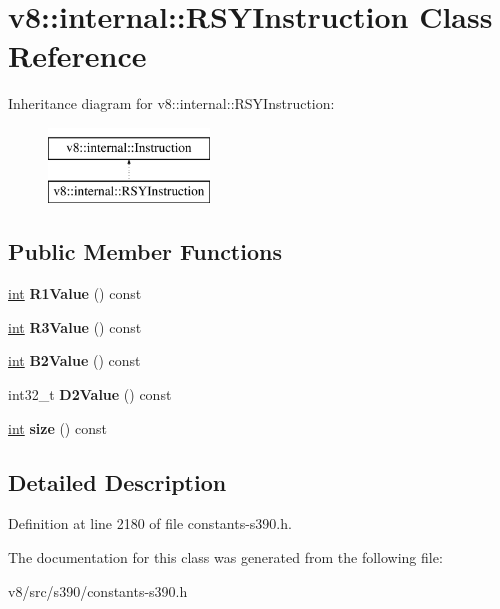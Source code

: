 \hypertarget{classv8_1_1internal_1_1RSYInstruction}{}\section{v8\+:\+:internal\+:\+:R\+S\+Y\+Instruction Class Reference}
\label{classv8_1_1internal_1_1RSYInstruction}
Inheritance diagram for v8\+:\+:internal\+:\+:R\+S\+Y\+Instruction\+:\begin{figure}[H]
\begin{center}
\leavevmode
\includegraphics[height=2.000000cm]{classv8_1_1internal_1_1RSYInstruction}
\end{center}
\end{figure}
\subsection*{Public Member Functions}
\begin{DoxyCompactItemize}
\item 
\mbox{\label{classv8_1_1internal_1_1RSYInstruction_ac874a31cc72d480eb094b2ffa28fc9d5}} 
\mbox{\hyperlink{classint}{int}} {\bfseries R1\+Value} () const
\item 
\mbox{\label{classv8_1_1internal_1_1RSYInstruction_aa75c5a7bf95acefe19216db32099bbed}} 
\mbox{\hyperlink{classint}{int}} {\bfseries R3\+Value} () const
\item 
\mbox{\label{classv8_1_1internal_1_1RSYInstruction_ac5e0ff5c904e16a6681a5210d3e8075d}} 
\mbox{\hyperlink{classint}{int}} {\bfseries B2\+Value} () const
\item 
\mbox{\label{classv8_1_1internal_1_1RSYInstruction_a78b5c60f2762c0627966970646ef7e1b}} 
int32\+\_\+t {\bfseries D2\+Value} () const
\item 
\mbox{\label{classv8_1_1internal_1_1RSYInstruction_a51e536f80bbed3177ff7720b82d8f30f}} 
\mbox{\hyperlink{classint}{int}} {\bfseries size} () const
\end{DoxyCompactItemize}


\subsection{Detailed Description}


Definition at line 2180 of file constants-\/s390.\+h.



The documentation for this class was generated from the following file\+:\begin{DoxyCompactItemize}
\item 
v8/src/s390/constants-\/s390.\+h\end{DoxyCompactItemize}
